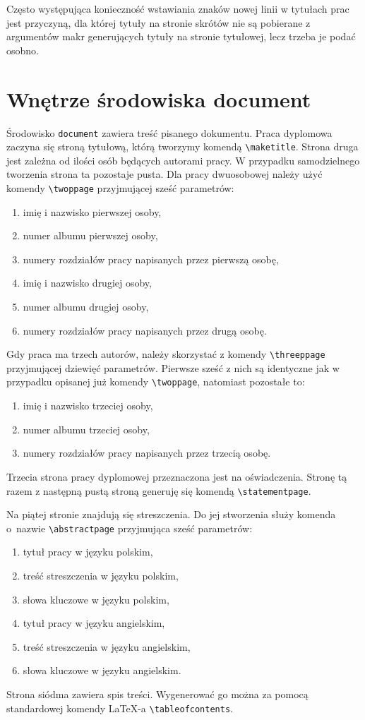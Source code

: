 \documentclass{SGGW-thesis}
\begin{document}
Często występująca konieczność wstawiania znaków nowej linii w tytułach prac jest przyczyną, dla której tytuły na stronie skrótów nie są pobierane z argumentów makr generujących tytuły na stronie tytułowej, lecz trzeba je podać  osobno.


\section{Wnętrze środowiska document}
Środowisko \verb|document| zawiera treść pisanego dokumentu. Praca dyplomowa zaczyna się stroną tytułową, którą tworzymy komendą \verb|\maketitle|. Strona druga jest zależna od ilości osób będących autorami pracy. W przypadku samodzielnego tworzenia strona ta pozostaje pusta. Dla pracy dwuosobowej należy użyć komendy \verb|\twoppage| przyjmującej sześć parametrów:
\begin{enumerate}
\item{imię i nazwisko pierwszej osoby,}
\item{numer albumu pierwszej osoby,}
\item{numery rozdziałów pracy napisanych przez pierwszą osobę,}
\item{imię i nazwisko drugiej osoby,}
\item{numer albumu drugiej osoby,}
\item{numery rozdziałów pracy napisanych przez drugą osobę.}
\end{enumerate}
Gdy praca ma trzech autorów, należy skorzystać z komendy \verb|\threeppage| przyjmującej dziewięć parametrów. Pierwsze sześć z nich są identyczne jak w przypadku opisanej już komendy \verb|\twoppage|, natomiast pozostałe to:
\begin{enumerate}\addtocounter{enumi}{6}
\item{imię i nazwisko trzeciej osoby,}
\item{numer albumu trzeciej osoby,}
\item{numery rozdziałów pracy napisanych przez trzecią osobę.}
\end{enumerate}
Trzecia strona pracy dyplomowej przeznaczona jest na oświadczenia. Stronę tą razem z następną pustą stroną generuję się komendą \verb|\statementpage|.

Na piątej stronie znajdują się streszczenia. Do jej stworzenia służy komenda o~nazwie \verb|\abstractpage| przyjmująca sześć parametrów:
\begin{enumerate}
\item{tytuł pracy w języku polskim,}
\item{treść streszczenia w języku polskim,}
\item{słowa kluczowe w języku polskim,}
\item{tytuł pracy w języku angielskim,}
\item{treść streszczenia w języku angielskim,}
\item{słowa kluczowe w języku angielskim.}
\end{enumerate}
Strona siódma zawiera spis treści. Wygenerować go można za pomocą standardowej komendy \LaTeX-a \verb|\tableofcontents|.
\end{document}
